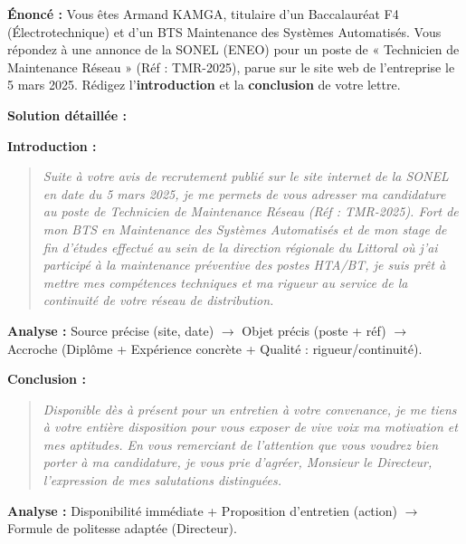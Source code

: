 \documentclass[11pt]{article}
\begin{document}
\begin{exoresolu}
    \textbf{Énoncé :} Vous êtes Armand KAMGA, titulaire d'un Baccalauréat F4 (Électrotechnique) et d'un BTS Maintenance des Systèmes Automatisés. Vous répondez à une annonce de la SONEL (ENEO) pour un poste de « Technicien de Maintenance Réseau » (Réf : TMR-2025), parue sur le site web de l'entreprise le 5 mars 2025. Rédigez l'\textbf{introduction} et la \textbf{conclusion} de votre lettre.

    \tcblower
    \textbf{Solution détaillée :}

    \textbf{Introduction :}
    \begin{quote}
    \textit{Suite à votre avis de recrutement publié sur le site internet de la SONEL en date du 5 mars 2025, je me permets de vous adresser ma candidature au poste de Technicien de Maintenance Réseau (Réf : TMR-2025). Fort de mon BTS en Maintenance des Systèmes Automatisés et de mon stage de fin d'études effectué au sein de la direction régionale du Littoral où j'ai participé à la maintenance préventive des postes HTA/BT, je suis prêt à mettre mes compétences techniques et ma rigueur au service de la continuité de votre réseau de distribution.}
    \end{quote}
    \textbf{Analyse :} Source précise (site, date) $\rightarrow$ Objet précis (poste + réf) $\rightarrow$ Accroche (Diplôme + Expérience concrète + Qualité : rigueur/continuité).

    \textbf{Conclusion :}
    \begin{quote}
    \textit{Disponible dès à présent pour un entretien à votre convenance, je me tiens à votre entière disposition pour vous exposer de vive voix ma motivation et mes aptitudes. En vous remerciant de l'attention que vous voudrez bien porter à ma candidature, je vous prie d'agréer, Monsieur le Directeur, l'expression de mes salutations distinguées.}
    \end{quote}
    \textbf{Analyse :} Disponibilité immédiate + Proposition d'entretien (action) $\rightarrow$ Formule de politesse adaptée (Directeur).
\end{exoresolu}
\end{document}
